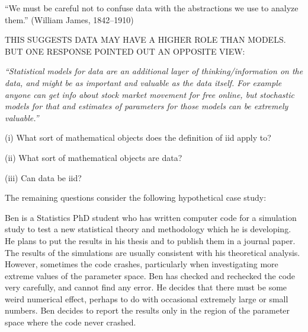 \documentclass[portrait,11pt]{seminar}
\begin{document}
\es
\bs

``We must be careful not to confuse data with the abstractions we use to analyze them.'' (William James, 1842--1910)


\medskip

THIS SUGGESTS DATA MAY HAVE A HIGHER ROLE THAN MODELS. BUT ONE RESPONSE POINTED OUT AN OPPOSITE VIEW:

\medskip

{\it ``Statistical models for data are an additional layer of thinking/information on the data, and might be as important and valuable as the data itself. For example anyone can get info about stock market movement for free online, but stochastic models for that and estimates of parameters for those models can be extremely valuable.''}

\es
\bs

(i) What sort of mathematical objects does the definition of iid apply to?

\medskip

\medskip

\medskip

(ii) What sort of mathematical objects are data?

\medskip

\medskip

\medskip

(iii) Can data be iid?

\es


\bs

The remaining questions consider the following hypothetical case study:

Ben is a Statistics PhD student who has written computer code for a simulation study to test a new statistical theory and methodology which he is developing.
He plans to put the results in his thesis and to publish them in a journal paper.
The results of the simulations are usually consistent with his theoretical analysis. 
However, sometimes the code crashes, particularly when investigating more extreme values of the parameter space.
Ben has checked and rechecked the code very carefully, and cannot find any error.
He decides that there must be some weird numerical effect, perhaps to do with occasional extremely large or small numbers.
Ben decides to report the results only in the region of the parameter space where the code never crashed. 

\es  {}
\end{document}
